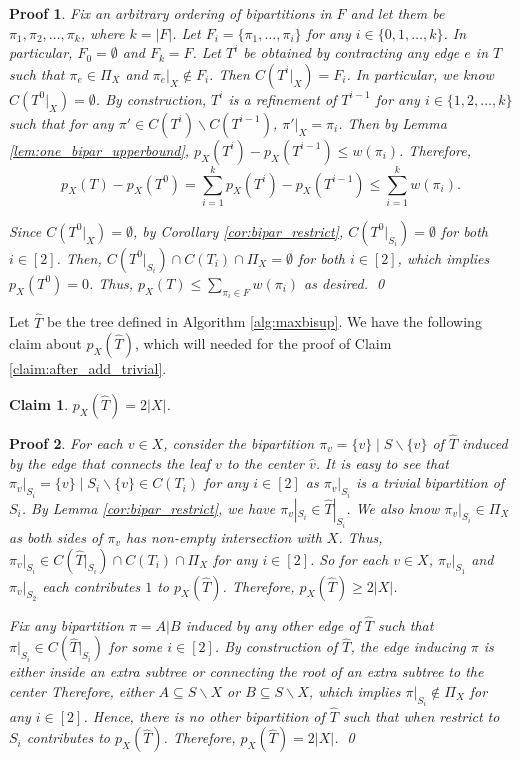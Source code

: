 \documentclass{bmcart}
\theoremstyle{mystyle}
\newtheorem{claim}{Claim}
\theoremstyle{proofstyle}
\newtheorem*{proof2}{Proof}
\newenvironment{proofnospace}{\begin{proof2}}{\qed \end{proof2}}
\begin{document}
\lemCompatibleSetUpperbound*
\begin{proofnospace}
    Fix an arbitrary ordering of bipartitions in $F$ and let them be $\pi_1,\pi_2,\dots,\pi_k$, where $k = |F|$. Let $F_i = \{\pi_1,\dots, \pi_i\}$ for any $i \in \{0,1,\dots,k\}$. In particular, $F_0 = \emptyset$ and $F_k = F$. Let $T^i$ be obtained by contracting any edge $e$ in $T$ such that $\pi_e \in \Pi_X$ and $\pi_e|_X \notin F_i$. Then $C(T^i|_X) = F_i$. In particular, we know $C(T^0|_X) = \emptyset$. By construction, $T^i$ is a refinement of $T^{i-1}$ for any $i \in \{1,2,\dots,k\}$ such that for any $\pi' \in C(T^i)\backslash C(T^{i-1})$, $\pi'|_X = \pi_i$. Then by Lemma \ref{lem:one_bipar_upperbound}, $p_X(T^i) - p_X(T^{i-1}) \le w(\pi_i)$. Therefore, 
    \[p_X(T) - p_X(T^0) = \sum_{i = 1}^k p_X(T^i) - p_X(T^{i-1}) \le \sum_{i = 1}^k w(\pi_i).\]
    
    Since $C(T^0|_X) = \emptyset$, by Corollary \ref{cor:bipar_restrict}, $C(T^0|_{S_i}) = \emptyset$ for both $i \in [2]$. Then, $C(T^0|_{S_i}) \cap C(T_i) \cap \Pi_X = \emptyset$ for both $i \in [2]$, which implies $p_X(T^0) = 0$. Thus, $p_X(T) \le \sum_{\pi_i \in F}w(\pi_i)$ as desired.
\end{proofnospace}


Let $\hat{T}$ be the tree defined in Algorithm \ref{alg:maxbisup}. We have the following claim about $p_X(\hat{T})$, which will needed for the proof of Claim \ref{claim:after_add_trivial}.
\begin{claim} \label{claim:begin_tree}
    $p_X(\hat{T}) = 2 |X|$. 
\end{claim}
\begin{proofnospace}
    For each $v \in X$, consider the bipartition $\pi_v = \{v\}\mid S \backslash \{v\}$ of $\hat{T}$ induced by the edge that connects the leaf $v$ to the center $\hat{v}$. It is easy to see that $\pi_v|_{S_i} = \{v\} \mid S_i \backslash \{v\} \in C(T_i)$ for any $i \in [2]$ as $\pi_v|_{S_i}$ is a trivial bipartition of $S_i$. By Lemma \ref{cor:bipar_restrict}, we have $\pi_v|_{S_i} \in \hat{T}|_{S_i}$. We also know $\pi_v|_{S_i} \in \Pi_X$ as both sides of $\pi_v$ has non-empty intersection with $X$. Thus, $\pi_v|_{S_i} \in C(\hat{T}|_{S_i}) \cap C(T_i) \cap \Pi_X$ for any $i \in [2]$. So for each $v \in X$, $\pi_v|_{S_1}$ and $\pi_v|_{S_2}$ each contributes $1$ to $p_X(\hat{T})$. Therefore, $p_X(\hat{T}) \ge 2|X|$. \smallskip
    
    Fix any bipartition $\pi = A|B$ induced by any other edge of $\hat{T}$ such that $\pi|_{S_i} \in C(\hat{T}|_{S_i})$ for some $i \in [2]$. By construction of $\hat{T}$, the edge inducing $\pi$ is either inside an extra subtree or connecting the root of an extra subtree to the center Therefore, either $A \subseteq S\backslash X $ or $B \subseteq S \backslash X$, which implies $\pi|_{S_i} \notin \Pi_X$ for any $i \in [2]$. Hence, there is no other bipartition of $\hat{T}$ such that when restrict to $S_i$ contributes to $p_X(\hat{T})$. Therefore, $p_X(\hat{T}) = 2|X|$.
\end{proofnospace}
\end{document}
